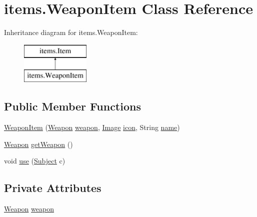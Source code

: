 \hypertarget{classitems_1_1_weapon_item}{}\section{items.\+Weapon\+Item Class Reference}
\label{classitems_1_1_weapon_item}
Inheritance diagram for items.\+Weapon\+Item\+:\begin{figure}[H]
\begin{center}
\leavevmode
\includegraphics[height=2.000000cm]{classitems_1_1_weapon_item}
\end{center}
\end{figure}
\subsection*{Public Member Functions}
\begin{DoxyCompactItemize}
\item 
\mbox{\hyperlink{classitems_1_1_weapon_item_ac656d19c4d8f5fd8e63dfd26107e2652}{Weapon\+Item}} (\mbox{\hyperlink{classitems_1_1weapons_1_1_weapon}{Weapon}} \mbox{\hyperlink{classitems_1_1_weapon_item_ac409bfd1c448db978d0ebc4ed3a594a6}{weapon}}, \mbox{\hyperlink{classorg_1_1newdawn_1_1slick_1_1_image}{Image}} \mbox{\hyperlink{classitems_1_1_item_afa445ad011d48c3455b0c04bec2581f9}{icon}}, String \mbox{\hyperlink{classitems_1_1_item_a086327df1ba046bbbe3fa2f753226d73}{name}})
\item 
\mbox{\hyperlink{classitems_1_1weapons_1_1_weapon}{Weapon}} \mbox{\hyperlink{classitems_1_1_weapon_item_a4536195f6a08b29473dbc77e72d33cbd}{get\+Weapon}} ()
\item 
void \mbox{\hyperlink{classitems_1_1_weapon_item_acea8bd206dd0007a915a855d3fbde071}{use}} (\mbox{\hyperlink{classentities_1_1_subject}{Subject}} c)
\end{DoxyCompactItemize}
\subsection*{Private Attributes}
\begin{DoxyCompactItemize}
\item 
\mbox{\hyperlink{classitems_1_1weapons_1_1_weapon}{Weapon}} \mbox{\hyperlink{classitems_1_1_weapon_item_ac409bfd1c448db978d0ebc4ed3a594a6}{weapon}}
\end{DoxyCompactItemize}


